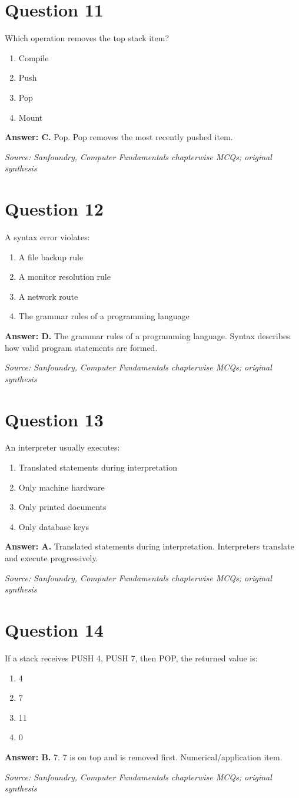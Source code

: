 \documentclass[11pt,a4paper]{book}
\newcommand{\source}[1]{\par\smallskip\textit{Source: #1}}
\newcommand{\answer}[2]{\par\textbf{Answer: #1.} #2}
\begin{document}
\section*{Question 11}
Which operation removes the top stack item?
\begin{enumerate}[label=\Alph*.]
\item Compile
\item Push
\item Pop
\item Mount
\end{enumerate}
\answer{C}{Pop. Pop removes the most recently pushed item.}
\source{Sanfoundry, Computer Fundamentals chapterwise MCQs; original synthesis}
\section*{Question 12}
A syntax error violates:
\begin{enumerate}[label=\Alph*.]
\item A file backup rule
\item A monitor resolution rule
\item A network route
\item The grammar rules of a programming language
\end{enumerate}
\answer{D}{The grammar rules of a programming language. Syntax describes how valid program statements are formed.}
\source{Sanfoundry, Computer Fundamentals chapterwise MCQs; original synthesis}
\section*{Question 13}
An interpreter usually executes:
\begin{enumerate}[label=\Alph*.]
\item Translated statements during interpretation
\item Only machine hardware
\item Only printed documents
\item Only database keys
\end{enumerate}
\answer{A}{Translated statements during interpretation. Interpreters translate and execute progressively.}
\source{Sanfoundry, Computer Fundamentals chapterwise MCQs; original synthesis}
\section*{Question 14}
If a stack receives PUSH 4, PUSH 7, then POP, the returned value is:
\begin{enumerate}[label=\Alph*.]
\item 4
\item 7
\item 11
\item 0
\end{enumerate}
\answer{B}{7. 7 is on top and is removed first. Numerical/application item.}
\source{Sanfoundry, Computer Fundamentals chapterwise MCQs; original synthesis}
\end{document}
